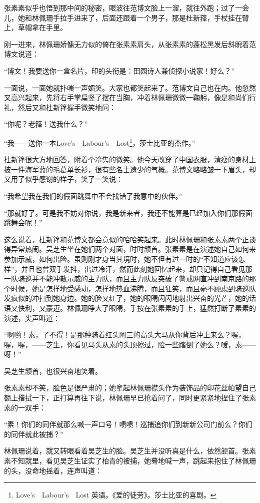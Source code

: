 \par 张素素似乎也悟到那中间的秘密，眼波往范博文脸上一溜，就往外跑；过了一会儿，她和林佩珊手拉手进来了，后面还跟着一个男子，那是杜新箨，手杖挂在臂上，草帽拿在手里。
\par 刚一进来，林佩珊娇慵无力似的倚在张素素肩头，从张素素的蓬松黑发后斜睨着范博文说道：
\par “博文！我要送你一盒名片，印的头衔是：田园诗人兼侦探小说家！好么？”
\par 一面说，一面她就扑嗤一声媚笑。大家也都笑起来了。范博文自己也在内。他忽然又高兴起来，先将右手掌扁竖了摆在当胸，冲着林佩珊微微一鞠躬，像是和尚们行礼，然后又和杜新箨握手微笑地问：
\par “你呢？老箨！送我什么？”
\par “我——送你一本Love's　Labour's　Lost\footnote{Love's　Labour's　Lost 英语。《爱的徒劳》。莎士比亚的喜剧。}，莎士比亚的杰作。”
\par 杜新箨很大方地回答，附着个冷隽的微笑。他今天改穿了中国衣服，清瘦的身材上披一件海军蓝的毛葛单长衫，很有些名士遗少的气概。范博文略略皱一下眉头，却又用了似乎感谢的样子，笑了一笑说：
\par “我希望我在我们的假面跳舞中不会找错了我意中的伙伴。”
\par “那就好了。可是我不妨对你说，我是新来者，我还不能算是已经加入你们那假面跳舞会呢！”
\par 这么说着，杜新箨和范博文都会意似的哈哈笑起来。此时林佩珊和张素素两个正谈得异常热闹。吴芝生坐在她们两个对面，时时颔首。张素素是在演述她自己如何来参加示威，如何出险。虽则刚才身当其境时，她不但有过一时的“不知道应该怎样”，并且也曾双手发抖，出过冷汗，然而此刻她回忆起来，却只记得自己看见那一队骑巡并不能冲散示威的主力队，而且主力队反突破了警戒网直冲到南京路的那个时候，她是怎样地受感动，怎样地热血沸腾，而且狂笑，而且毫不顾虑到骑巡队发疯似的冲扫到她身边。她的脸又红了，她的眼睛闪闪地射出兴奋的光芒，她的话语又快利，又豪迈。林佩珊睁大了眼睛，手按在张素素的手上，猛然打断了素素的演述，尖声叫道：
\par “啊哟！素，了不得！是那种骑着红头阿三的高头大马从你背后冲上来么？喔，喔，喔，——芝生，你看见马头从素的头顶擦过，险一些踏倒了她么？嗳，素——呀！”
\par 吴芝生颔首，也很兴奋地笑着。
\par 张素素却不笑，脸色是很严肃的；她拿起林佩珊襟头作为装饰品的印花丝帕望自己额上揩拭一下，正打算再往下说，林佩珊早已抢着问了，同时更紧紧地捏住了张素素的一双手：
\par “素！你们的同伴就那么喊一声口号！啧啧！巡捕追你们到新新公司门前么？你们的同伴就此被捕？”
\par 林佩珊说着，就又转眼看着吴芝生的脸。吴芝生并没听真是什么，依然颔首。张素素不知就里，看见吴芝生证实了柏青的被捕，她蓦地喊一声，跳起来抱住了林佩珊的头，没命地摇着，连声叫道：
